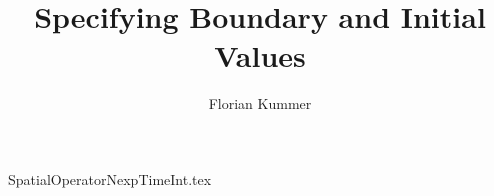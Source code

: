 \documentclass[10pt,a4paper]{article}
\title{Specifying Boundary and Initial Values}
\author{Florian Kummer}
\begin{document}
\maketitle

{SpatialOperatorNexpTimeInt.tex}
\end{document}
